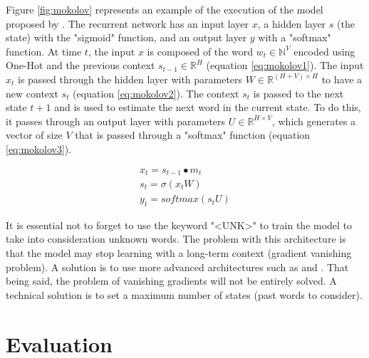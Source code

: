 \documentclass{KBook}
\begin{document}
Figure \ref{fig:mokolov} represents an example of the execution of the model proposed by \citet{2010-mokolov-al}.
The recurrent network has an input layer $x$, a hidden layer $s$ (the state) with the "sigmoid" function, and an output layer $y$ with a "softmax" function.
At time $t$, the input $x$ is composed of the word $w_t \in \mathbb{N}^{V}$ encoded using One-Hot and the previous context $s_{t-1} \in \mathbb{R}^{H}$ (equation \ref{eq:mokolov1}). 
The input $x_t$ is passed through the hidden layer with parameters $W \in \mathbb{R}^{(H+V)\times H}$ to have a new context $s_t$ (equation \ref{eq:mokolov2}). 
The context $s_t$ is passed to the next state $t+1$ and is used to estimate the next word in the current state.
To do this, it passes through an output layer with parameters $U \in \mathbb{R}^{H\times V}$, which generates a vector of size $V$ that is passed through a "softmax" function (equation \ref{eq:mokolov3}).

\begin{align}
	x_t = s_{t-1} \bullet m_t \label{eq:mokolov1}\\
	s_t = \sigma(x_t W) \label{eq:mokolov2}\\
	y_t = softmax(s_t U) \label{eq:mokolov3}
\end{align}

It is essential not to forget to use the keyword "<UNK>" to train the model to take into consideration unknown words. 
The problem with this architecture is that the model may stop learning with a long-term context (gradient vanishing problem).
A solution is to use more advanced architectures such as  and . 
That being said, the problem of vanishing gradients will not be entirely solved.
A technical solution is to set a maximum number of states (past words to consider).

\section{Evaluation}
\end{document}
